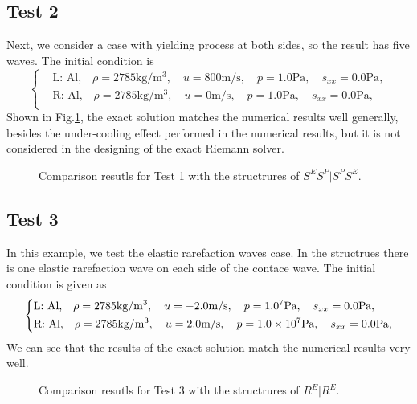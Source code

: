 \documentclass{article}
\numberwithin{equation}{section}
\numberwithin{table}{section}
\begin{document}
\subsection{Test 2}
Next, we consider a case with yielding process at both sides, so the result has five waves. The initial condition is
\begin{equation}
 \left\{ \begin{aligned}
	 &	 \text{L: Al,}\quad  \rho = 2785 \text{kg}/\text{m}^3, \quad  u = 800\text{m}/\text{s}, \quad  p = 1.0\text{Pa}, \quad  s_{xx}=0.0 \text{Pa},\\
&	 \text{R: Al,}\quad  \rho = 2785 \text{kg}/\text{m}^3, \quad  u = 0\text{m}/\text{s}, \quad  p = 1.0\text{Pa}, \quad  s_{xx}=0.0 \text{Pa},\\
   \end{aligned}
 \right.
\end{equation}
Shown in Fig.\ref{fig:case2}, the exact solution matches the numerical results well generally, besides the under-cooling effect performed in the numerical results, but it is not considered in the designing of the exact Riemann solver.
\begin{figure}
  \centering
  \caption{Comparison resutls for Test 1 with the structrures of $S^ES^P|S^PS^E$.  }
  \label{fig:case2}
\end{figure}

\subsection{Test 3}
In this example, we test the elastic rarefaction waves case. In the structrues there  is one  elastic rarefaction wave on each side of the contace wave. The initial condition is given as
\begin{equation}
 \left\{ \begin{aligned}
	 &	 \text{L: Al,}\quad  \rho = 2785 \text{kg}/\text{m}^3, \quad  u = -2.0\text{m}/\text{s}, \quad  p = 1.0\time 10^7\text{Pa}, \quad  s_{xx}=0.0 \text{Pa},\\
	 &	 \text{R: Al,}\quad  \rho = 2785 \text{kg}/\text{m}^3, \quad  u = 2.0\text{m}/\text{s}, \quad  p = 1.0\times 10^7 \text{Pa}, \quad  s_{xx}=0.0 \text{Pa},\\
   \end{aligned}
 \right.
\end{equation}
We can see that the results of the exact solution match the numerical results very well.
%
\begin{figure}
  \centering


    \caption{Comparison resutls for Test 3 with the structrures of $R^E|R^E$.  }
  \label{fig:case3}
\end{figure}
\end{document}
